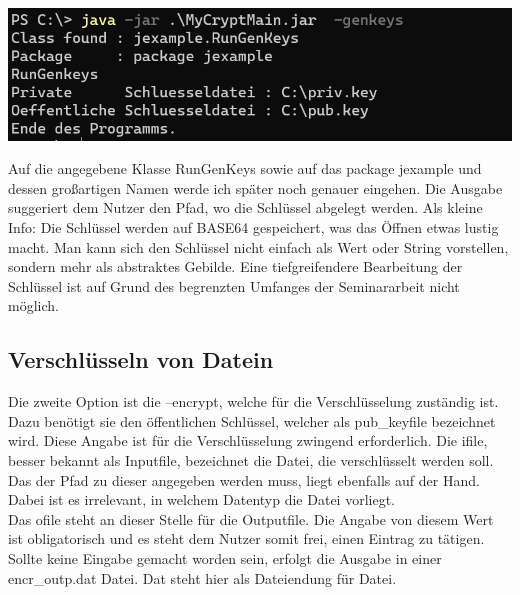 \begin{center}
	\includegraphics[width=\textwidth]{./img/genkeys}
\end{center}

Auf die angegebene Klasse RunGenKeys sowie auf das package jexample und dessen großartigen Namen werde ich später noch genauer eingehen. Die Ausgabe suggeriert dem Nutzer den Pfad, wo die Schlüssel abgelegt werden. Als kleine Info: Die Schlüssel werden auf BASE64 gespeichert, was das Öffnen etwas lustig macht. Man kann sich den Schlüssel nicht einfach als Wert oder String vorstellen, sondern mehr als abstraktes Gebilde. Eine tiefgreifendere Bearbeitung der Schlüssel ist auf Grund des begrenzten Umfanges der Seminararbeit nicht möglich. \\


\subsection{Verschlüsseln von Datein}
Die zweite Option ist die –encrypt, welche für die Verschlüsselung zuständig ist. Dazu benötigt sie den öffentlichen Schlüssel, welcher als pub\_keyfile bezeichnet wird. Diese Angabe ist für die Verschlüsselung zwingend erforderlich. Die ifile, besser bekannt als Inputfile, bezeichnet die Datei, die verschlüsselt werden soll. Das der Pfad zu dieser angegeben werden muss, liegt ebenfalls auf der Hand. Dabei ist es irrelevant, in welchem Datentyp die Datei vorliegt.\\
 Das ofile steht an dieser Stelle für die Outputfile. Die Angabe von diesem Wert ist obligatorisch und es steht dem Nutzer somit frei, einen Eintrag zu tätigen. Sollte keine Eingabe gemacht worden sein, erfolgt die Ausgabe in einer encr\_outp.dat Datei. Dat steht hier als Dateiendung für Datei.\\


